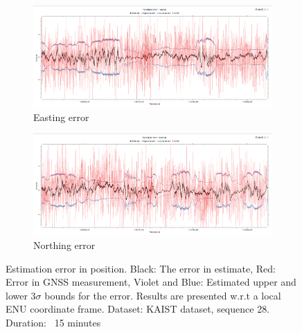 \begin{figure}[h]
	\centering
    \begin{subfigure}{\textwidth}
        \includegraphics[width=\textwidth]{figs/easting_error.png}
        \caption{Easting error}
    \end{subfigure}
    \begin{subfigure}{\textwidth}
        \includegraphics[width=\textwidth]{figs/northing_error.png}
        \caption{Northing error}
    \end{subfigure}
    \vspace{-0.5cm}
    \caption[Estimation error in position]{Estimation error in position. Black: The error in estimate, Red: Error in \gls{GNSS} measurement, Violet and Blue: Estimated upper and lower 3$\sigma$ bounds for the error. Results are presented w.r.t a local \gls{ENU} coordinate frame. Dataset: \gls{KAIST} dataset, sequence 28. Duration: ~15 minutes}
    \label{fig:pa:estimationError}
    \vspace{0.5cm}
\end{figure}

